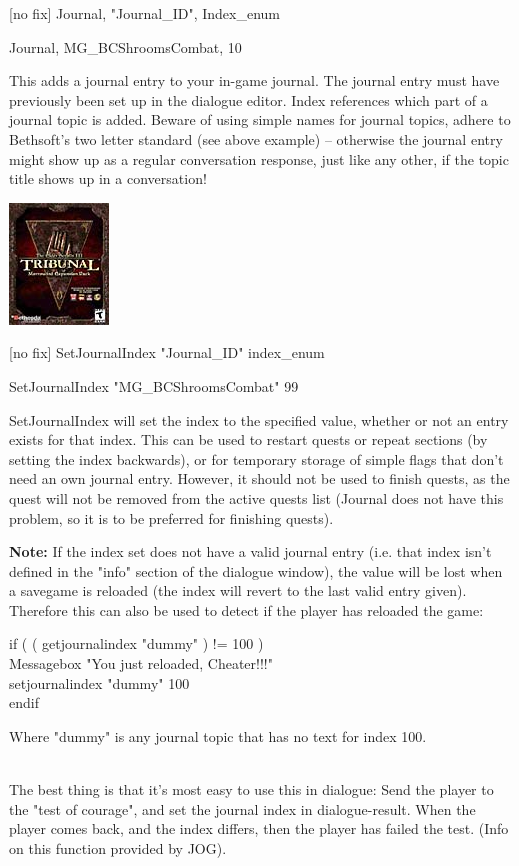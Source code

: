 {[}no fix{]} Journal, "Journal\_ID", Index\_enum

Journal, MG\_BCShroomsCombat, 10

This adds a journal entry to your in-game journal. The journal entry
must have previously been set up in the dialogue editor. Index
references which part of a journal topic is added. Beware of using
simple names for journal topics, adhere to Bethsoft's two letter
standard (see above example) -- otherwise the journal entry might show
up as a regular conversation response, just like any other, if the topic
title shows up in a conversation!

\includegraphics{media/image6.png}

{[}no fix{]} SetJournalIndex "Journal\_ID" index\_enum

SetJournalIndex "MG\_BCShroomsCombat" 99

SetJournalIndex will set the index to the specified value, whether or
not an entry exists for that index. This can be used to restart quests
or repeat sections (by setting the index backwards), or for temporary
storage of simple flags that don't need an own journal entry. However,
it should not be used to finish quests, as the quest will not be removed
from the active quests list (Journal does not have this problem, so it
is to be preferred for finishing quests).

\textbf{Note:} If the index set does not have a valid journal entry
(i.e. that index isn't defined in the "info" section of the dialogue
window), the value will be lost when a savegame is reloaded (the index
will revert to the last valid entry given). Therefore this can also be
used to detect if the player has reloaded the game:

if ( ( getjournalindex "dummy" ) != 100 )\\
Messagebox "You just reloaded, Cheater!!!"\\
setjournalindex "dummy" 100\\
endif

Where "dummy" is any journal topic that has no text for index 100.\\
\strut \\
The best thing is that it's most easy to use this in dialogue: Send the
player to the "test of courage", and set the journal index in
dialogue-result. When the player comes back, and the index differs, then
the player has failed the test. (Info on this function provided by JOG).

